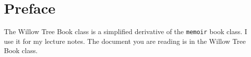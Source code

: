 \documentclass{willowtreebook}
\begin{document}
\chapter{Preface}
The Willow Tree Book class is a simplified derivative of the \verb!memoir! book class.
I use it for my lecture notes.
The document you are reading is in the Willow Tree Book class.

\afterpreface




\end{document}
